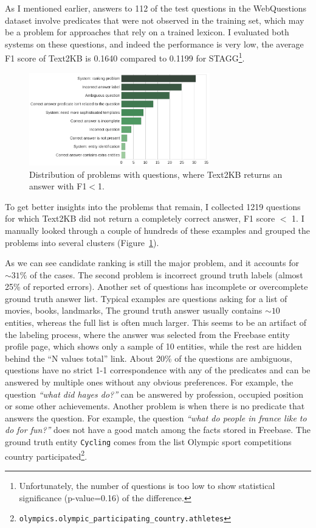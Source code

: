 As I mentioned earlier, answers to 112 of the test questions in the WebQuestions dataset involve predicates that were not observed in the training set, which may be a problem for approaches that rely on a trained lexicon.
I evaluated both systems on these questions, and indeed the performance is very low, \ie the average F1 score of Text2KB is 0.1640 compared to 0.1199 for STAGG\footnote{Unfortunately, the number of questions is too low to show statistical significance (p-value=0.16) of the difference.}.

\begin{figure}
\centering
\includegraphics[width=0.7\textwidth]{img/error_analysis}
\caption{Distribution of problems with questions, where Text2KB returns an answer with F1$<$1.}
\label{figure:factoid:text2kb:error_analysis}
\end{figure}

To get better insights into the problems that remain, I collected 1219 questions for which Text2KB did not return a completely correct answer, \ie F1 score $<$ 1.
I manually looked through a couple of hundreds of these examples and grouped the problems into several clusters (Figure~\ref{figure:factoid:text2kb:error_analysis}).

As we can see candidate ranking is still the major problem, and it accounts for $\sim31\%$ of the cases.
The second problem is incorrect ground truth labels (almost 25\% of reported errors).
Another set of questions has incomplete or overcomplete ground truth answer list.
Typical examples are questions asking for a list of movies, books, landmarks, \etc
The ground truth answer usually contains $\sim10$ entities, whereas the full list is often much larger.
This seems to be an artifact of the labeling process, where the answer was selected from the Freebase entity profile page, which shows only a sample of 10 entities, while the rest are hidden behind the ``N values total'' link.
About 20\% of the questions are ambiguous, \ie questions have no strict 1-1 correspondence with any of the predicates and can be answered by multiple ones without any obvious preferences.
For example, the question \textit{``what did hayes do?''} can be answered by profession, occupied position or some other achievements.
Another problem is when there is no predicate that answers the question.
For example, the question \textit{``what do people in france like to do for fun?''} does not have a good match among the facts stored in Freebase.
The ground truth entity \texttt{Cycling} comes from the list Olympic sport competitions country participated\footnote{\texttt{olympics.olympic\_participating\_country.athletes}}.

